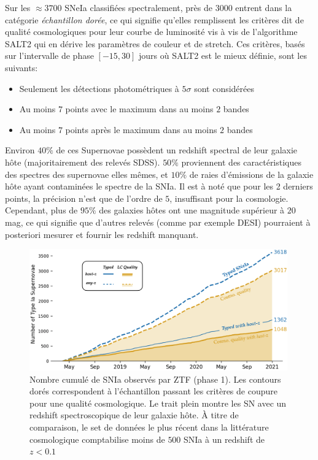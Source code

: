 \documentclass[../main/main.tex]{subfiles}
\begin{document}
Sur les $\approx3700$ SNeIa classifiées spectralement, près de
$3000$ entrent dans la catégorie \textit{échantillon dorée}, ce qui
signifie qu'elles remplissent les critères dit de qualité cosmologiques
pour leur courbe de luminosité vis à vis de l'algorithme SALT2 qui en
dérive les paramètres de couleur et de stretch. Ces
critères, basés sur l'intervalle de phase $[-15,30]$ jours où SALT2 est
le mieux définie, sont les suivants:

\begin{itemize}[label=$\diamondsuit$]
  \itemsep0em 
   \item Seulement les détections photométriques à $5\sigma$ sont
     considérées
   \item Au moins $7$ points avec le maximum dans au moins $2$ bandes
   \item Au moins $7$ points après le maximum dans au moins $2$ bandes
\end{itemize}

Environ $40\%$ de ces Supernovae possèdent un redshift spectral de leur
galaxie hôte (majoritairement des relevés SDSS). $50\%$ proviennent des
caractéristiques des spectres des supernovae elles mêmes, et $10\%$ de
raies d'émissions de la galaxie hôte ayant contaminées le spectre de la
SNIa. Il est à noté que pour les 2 derniers points, la précision n'est
que de l'ordre de $5$\textperthousand, insuffisant pour la cosmologie.
Cependant, plus de $95\%$ des galaxies hôtes ont une magnitude supérieur
à $20$ mag, ce qui signifie que d'autres relevés (comme par exemple
DESI) pourraient à posteriori mesurer et fournir les redshift manquant.

\begin{figure}[h]
  \centering
  \includegraphics[width=0.99\textwidth]{../figures/02_ztf/cumulsniaztf.png}
  \caption[Nombre cumulé de SNIa observés par ZTF (phase 1)]{Nombre
    cumulé de SNIa observés par ZTF (phase 1). Les contours dorés
    correspondent à l'échantillon passant les critères de coupure pour
    une qualité cosmologique. Le trait plein montre les SN avec un
    redshift spectroscopique de leur galaxie hôte. À titre de
    comparaison, le set de données le plus récent dans la littérature
    cosmologique comptabilise moins de $500$ SNIa à un redshift de $z<0.1$}
  \label{fig:cumulsniaztf}
\end{figure}
\end{document}
